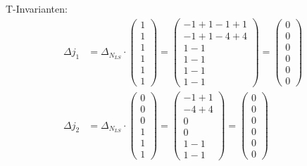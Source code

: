 \documentclass[12pt, paper=a4]{article}
\begin{document}
T-Invarianten:\\
\begin{align*}
\Delta j_1 &= \Delta_{N_{LS}} \cdot \begin{pmatrix}1 \\ 1 \\ 1 \\ 1 \\ 1 \\ 1\end{pmatrix} = 
\begin{pmatrix}-1+1-1+1 \\ -1+1-4+4 \\ 1-1 \\ 1-1 \\ 1-1 \\ 1-1\end{pmatrix} = 
\begin{pmatrix}0 \\ 0 \\ 0 \\ 0 \\ 0 \\ 0\end{pmatrix}
\\
\Delta j_2 &= \Delta_{N_{LS}} \cdot \begin{pmatrix}0 \\ 0 \\ 0 \\ 1 \\ 1 \\ 1\end{pmatrix} = 
\begin{pmatrix}-1+1 \\ -4+4 \\ 0 \\ 0 \\ 1-1 \\ 1-1\end{pmatrix} = 
\begin{pmatrix}0 \\ 0 \\ 0 \\ 0 \\ 0 \\ 0\end{pmatrix}
\end{align*}
\end{document}
